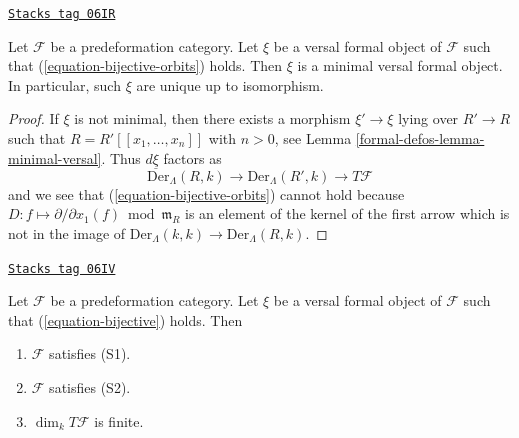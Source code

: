 \begin{lemma}
\label{formal-defos-lemma-miniversal-object-unique}
\href{https://stacks.math.columbia.edu/tag/06IR}{\texttt{Stacks tag 06IR}}

Let $\mathcal{F}$ be a predeformation category.
Let $\xi$ be a versal formal object of $\mathcal{F}$ such that
(\ref{equation-bijective-orbits}) holds.
Then $\xi$ is a minimal versal formal object.
In particular, such $\xi$ are unique up to isomorphism.
\end{lemma}

\begin{proof}
If $\xi$ is not minimal, then there exists a morphism
$\xi' \to \xi$ lying over $R' \to R$ such that
$R = R'[[x_1, \ldots, x_n]]$ with $n > 0$, see
Lemma \ref{formal-defos-lemma-minimal-versal}.
Thus $d\underline{\xi}$ factors as
$$
\text{Der}_\Lambda(R, k) \to
\text{Der}_\Lambda(R', k) \to T\mathcal{F}
$$
and we see that (\ref{equation-bijective-orbits}) cannot hold
because $D : f \mapsto \partial/\partial x_1(f) \bmod \mathfrak m_R$
is an element of the kernel of the first arrow which is not in the image of
$\text{Der}_\Lambda(k, k) \to \text{Der}_\Lambda(R, k)$.
\end{proof}

\begin{lemma}
\label{formal-defos-lemma-miniversal-object-existence-1}
\href{https://stacks.math.columbia.edu/tag/06IV}{\texttt{Stacks tag 06IV}}

Let $\mathcal{F}$ be a predeformation category.
Let $\xi$ be a versal formal object of $\mathcal{F}$ such that
(\ref{equation-bijective}) holds. Then
\begin{enumerate}
\item $\mathcal{F}$ satisfies (S1).
\item $\mathcal{F}$ satisfies (S2).
\item $\dim_k T\mathcal{F}$ is finite.
\end{enumerate}
\end{lemma}

